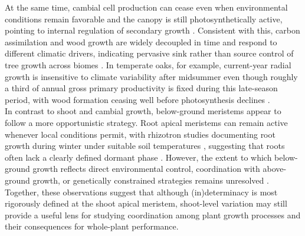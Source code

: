 \documentclass{article}
\begin{document}
	At the same time, cambial cell production can cease even when environmental conditions remain favorable and the canopy is still photosynthetically active, pointing to internal regulation of secondary growth \citep{buttoComparingCellDynamics2020, arendStemGrowthPhenology2024}. Consistent with this, carbon assimilation and wood growth are widely decoupled in time and respond to different climatic drivers, indicating pervasive sink rather than source control of tree growth across biomes \citep{cabonCrossbiomeSynthesisSource2022}. In temperate oaks, for example, current-year radial growth is insensitive to climate variability after midsummer even though roughly a third of annual gross primary productivity is fixed during this late-season period, with wood formation ceasing well before photosynthesis declines \citep{raoDecoupledCarbonAssimilation2026}.\\
	
	In contrast to shoot and cambial growth, below-ground meristems appear to follow a more opportunistic strategy. Root apical meristems can remain active whenever local conditions permit, with rhizotron studies documenting root growth during winter under suitable soil temperatures \citep{lyfordControlledGrowthForest1966}, suggesting that roots often lack a clearly defined dormant phase \citep{radvilleRootPhenologyChanging2016, marchandNoWinterHalt2025}. However, the extent to which below-ground growth reflects direct environmental control, coordination with above-ground growth, or genetically constrained strategies remains unresolved \citep{abramoffAreBelowgroundPhenology2015, makotoSynchronousAsynchronousRoot2020, silvestroRootsLeavesTree2025, campioliEnvironmentalSensitivityImpact2024}.\\
	
	Together, these observations suggest that although (in)determinacy is most rigorously defined at the shoot apical meristem, shoot-level variation may still provide a useful lens for studying coordination among plant growth processes and their consequences for whole-plant performance.\\
	
\end{document}
